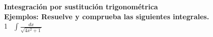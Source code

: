 \documentclass[12pt,a4paper]{article}
\begin{document}
{\bf Intesgración por sustitución trigonométrica}\\

{\bf Ejemplos: Resuelve y comprueba las siguientes integrales.}\\

\textcircled{1}\ $\displaystyle{\int\frac{dx}{\sqrt{4x^2+1}}}$
\end{document}
